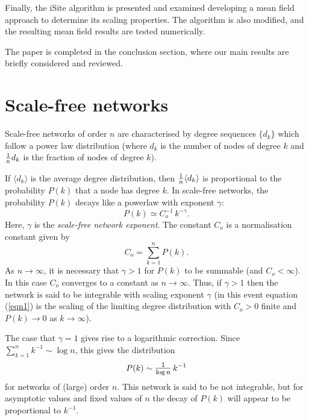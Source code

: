 \documentclass[12pt]{iopart}
\def\sfrac#1#2{\hbox{\normalsize $\frac{#1}{#2}$}}
\def\Sfrac#1#2{\hbox{\large$\frac{#1}{#2}$}}
\def\Ref#1{(\ref{#1})}
\begin{document}
Finally, the iSite algorithm is presented and examined developing a mean
field approach to determine its scaling properties.  The algorithm is also 
modified, and the resulting mean field results are tested numerically.

The paper is completed in the conclusion section, where our main results
are briefly considered and reviewed.



\section{Scale-free networks}

Scale-free networks of order $n$ are characterised by degree sequences 
$\{d_k \}$ which follow a power law distribution (where $d_k$ is the number of 
nodes of degree $k$ and $\sfrac{1}{n} d_k$ is the fraction of nodes of 
degree $k$).

If $\langle d_k \rangle$ is the average degree distribution, then 
$\sfrac{1}{n} \langle d_k \rangle$ is proportional to the probability 
$P(k)$ that a node has degree $k$. In scale-free networks, the
probability $P(k)$ decays like a powerlaw with exponent $\gamma$:
\begin{equation}
P(k) \simeq C_o^{-1}\, k^{-\gamma} .
\label{eqn1}  %
\end{equation}
Here, $\gamma$ is the \textit{scale-free network exponent}.   The constant $C_o$ is a
normalisation constant given by
\begin{equation}
C_o = \sum_{k=1}^n P(k) .
\end{equation}
As $n\to\infty$, it is necessary that $\gamma > 1$ for $P(k)$ to be summable 
(and $C_o<\infty$).   In this case $C_o$ converges to a constant as $n\to\infty$.
Thus, if $\gamma>1$ then the network is said to be integrable 
with scaling exponent $\gamma$ (in this event equation \Ref{eqn1} is the scaling of 
the limiting degree distribution with $C_o>0$ finite and $P(k) \to 0$ as $k\to\infty$).

The case that $\gamma = 1$ gives rise to a logarithmic correction.  Since
$\sum_{k=1}^n k^{-1} \sim \log n$, this gives the distribution
\begin{equation}
P(k) \sim \Sfrac{1}{\log n}\, k^{-1}
\end{equation}
for networks of (large) order $n$.  This network is said to be not integrable, but
for asymptotic values and fixed values of $n$ the decay of $P(k)$ will appear 
to be proportional to $k^{-1}$.
\end{document}
